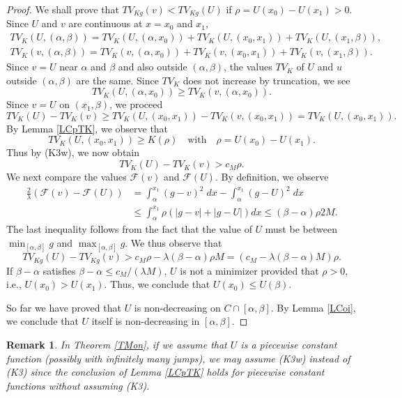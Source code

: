 \documentclass[11pt]{amsart} %
\numberwithin{equation}{section}
\newtheorem{remark}[thm]{Remark}
\begin{document}
\begin{proof}
We shall prove that $TV_{Kg}(v)<TV_{Kg}(U)$ if $\rho=U(x_0)-U(x_1)>0$.
 Since $U$ and $v$ are continuous at $x=x_0$ and $x_1$,
\begin{gather*}
	TV_K \left(U,(\alpha,\beta)\right) = TV_K \left(U,(\alpha,x_0) \right) 
	+ TV_K \left(U,(x_0,x_1) \right)
	+ TV_K \left(U,(x_1,\beta) \right), \\
	TV_K \left(v,(\alpha,\beta)\right)
	= TV_K \left(v,(\alpha,x_0) \right) 
	+ TV_K \left(v,(x_0,x_1) \right)
	+ TV_K \left(v,(x_1,\beta) \right).
\end{gather*}
Since $v=U$ near $\alpha$ and $\beta$ and also outside $(\alpha,\beta)$, the values $TV_K$ of $U$ and $u$ outside $(\alpha,\beta)$ are the same.
 Since $TV_K$ does not increase by truncation, we see
\[
	TV_K \left(U,(\alpha,x_0) \right) 
	\geq TV_K \left(v,(\alpha,x_0) \right).
\]
Since $v=U$ on $(x_1,\beta)$, we proceed
\begin{equation*}
	TV_K(U) - TV_K(v) 
	\geq TV_K \left(U,(x_0,x_1) \right)
	- TV_K \left(v,(x_0, x_1) \right)
	= TV_K \left(U,(x_0,x_1) \right).
\end{equation*}
By Lemma \ref{LCpTK}, we observe that
\[
	TV_K \left(U,(x_0,x_1) \right) 
	\geq K(\rho) \quad\text{with}\quad
	\rho = U(x_0) - U(x_1).
\]
Thus by (K3w), we now obtain
\[
	TV_K (U) - TV_K(v) > c_M\rho.
\]
We next compare the values $\mathcal{F}(v)$ and $\mathcal{F}(U)$.
 By definition, we observe
\begin{align*}
	\frac2\lambda \left(\mathcal{F}(v) - \mathcal{F}(U)\right)
	&= \int_\alpha^{x_1} (g-v)^2\; dx - \int_\alpha^{x_1} (g-U)^2\; dx \\
	& \leq \int_\alpha^{x_1} \rho\left( |g-v|+|g-U|\right) dx
    \leq (\beta-\alpha) \rho 2M.
\end{align*}
The last inequality follows from the fact that the value of $U$ must be between $\min_{[\alpha,\beta]}g$ and $\max_{[\alpha,\beta]}g$.
 We thus observe that
\begin{equation*}
    TV_{Kg} (U) - TV_{Kg}(v)
    > c_M\rho - \lambda(\beta-\alpha)\rho M
	=\left( c_M - \lambda(\beta-\alpha)M \right)\rho.
\end{equation*}
If $\beta-\alpha$ satisfies $\beta-\alpha\leq c_M/(\lambda M)$, $U$ is not a minimizer provided that $\rho>0$, i.e., $U(x_0)>U(x_1)$.
 Thus, we conclude that $U(x_0)\leq U(\beta)$.

So far we have proved that $U$ is non-decreasing on $C\cap[\alpha,\beta]$.
 By Lemma \ref{LCoi}, we conclude that $U$ itself is non-decreasing in $[\alpha,\beta]$.
\end{proof}
%
\begin{remark} \label{RK3w}
	In Theorem \ref{TMon}, if we assume that $U$ is a piecewise constant function (possibly with infinitely many jumps), we may assume (K3w) instead of (K3) since the conclusion of Lemma \ref{LCpTK} holds for piecewise constant functions without assuming (K3).
\end{remark}
\end{document}
